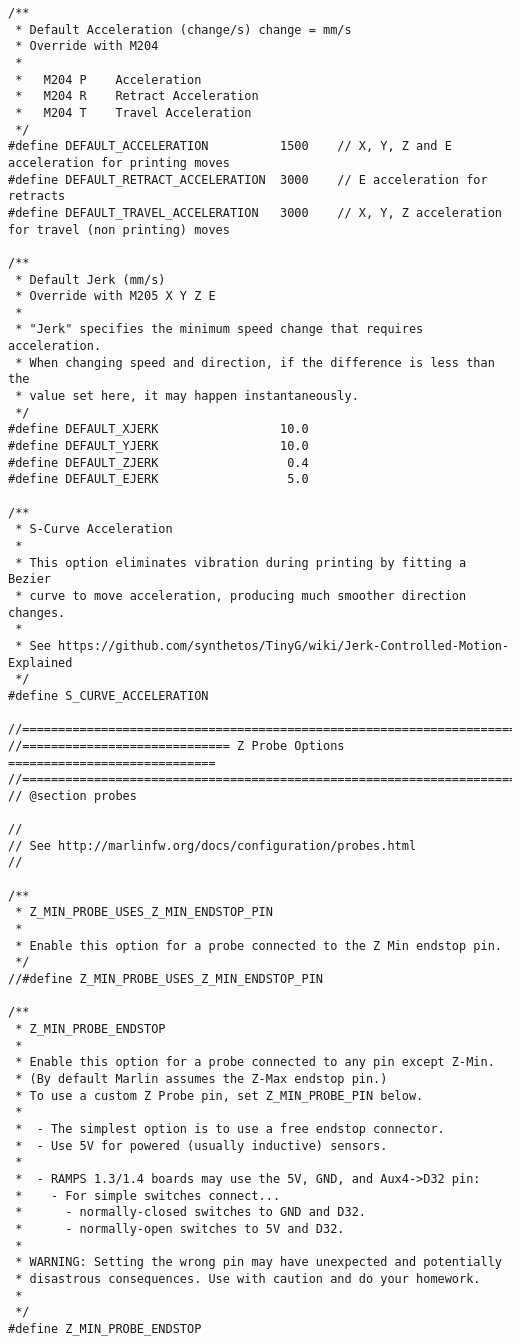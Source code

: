 \begin{lstlisting}
/**
 * Default Acceleration (change/s) change = mm/s
 * Override with M204
 *
 *   M204 P    Acceleration
 *   M204 R    Retract Acceleration
 *   M204 T    Travel Acceleration
 */
#define DEFAULT_ACCELERATION          1500    // X, Y, Z and E acceleration for printing moves
#define DEFAULT_RETRACT_ACCELERATION  3000    // E acceleration for retracts
#define DEFAULT_TRAVEL_ACCELERATION   3000    // X, Y, Z acceleration for travel (non printing) moves

/**
 * Default Jerk (mm/s)
 * Override with M205 X Y Z E
 *
 * "Jerk" specifies the minimum speed change that requires acceleration.
 * When changing speed and direction, if the difference is less than the
 * value set here, it may happen instantaneously.
 */
#define DEFAULT_XJERK                 10.0
#define DEFAULT_YJERK                 10.0
#define DEFAULT_ZJERK                  0.4
#define DEFAULT_EJERK                  5.0

/**
 * S-Curve Acceleration
 *
 * This option eliminates vibration during printing by fitting a Bezier
 * curve to move acceleration, producing much smoother direction changes.
 *
 * See https://github.com/synthetos/TinyG/wiki/Jerk-Controlled-Motion-Explained
 */
#define S_CURVE_ACCELERATION

//===========================================================================
//============================= Z Probe Options =============================
//===========================================================================
// @section probes

//
// See http://marlinfw.org/docs/configuration/probes.html
//

/**
 * Z_MIN_PROBE_USES_Z_MIN_ENDSTOP_PIN
 *
 * Enable this option for a probe connected to the Z Min endstop pin.
 */
//#define Z_MIN_PROBE_USES_Z_MIN_ENDSTOP_PIN

/**
 * Z_MIN_PROBE_ENDSTOP
 *
 * Enable this option for a probe connected to any pin except Z-Min.
 * (By default Marlin assumes the Z-Max endstop pin.)
 * To use a custom Z Probe pin, set Z_MIN_PROBE_PIN below.
 *
 *  - The simplest option is to use a free endstop connector.
 *  - Use 5V for powered (usually inductive) sensors.
 *
 *  - RAMPS 1.3/1.4 boards may use the 5V, GND, and Aux4->D32 pin:
 *    - For simple switches connect...
 *      - normally-closed switches to GND and D32.
 *      - normally-open switches to 5V and D32.
 *
 * WARNING: Setting the wrong pin may have unexpected and potentially
 * disastrous consequences. Use with caution and do your homework.
 *
 */
#define Z_MIN_PROBE_ENDSTOP


\end{lstlisting}
